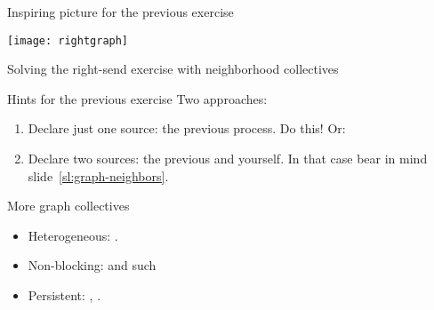 
\begin{exerciseframe}[rightgraph]
  \hyperlink{exserialsend}{}

  
\end{exerciseframe}

\begin{numberedframe}{Inspiring picture for the previous exercise}
  \label{fig:rightgraph}

  \texttt{[image: rightgraph]}

  Solving the right-send exercise with neighborhood
  collectives
\end{numberedframe}

\begin{numberedframe}{Hints for the previous exercise}
  Two approaches:
  \begin{enumerate}
  \item Declare just one source: the previous process. Do this! Or:
  \item Declare two sources: the previous and yourself.
    In that case bear in mind slide~\ref{sl:graph-neighbors}.
  \end{enumerate}
\end{numberedframe}

\begin{numberedframe}{More graph collectives}
  \begin{itemize}
  \item Heterogeneous: .
  \item Non-blocking:  and such
  \item Persistent:     ,
    .
  \end{itemize}
\end{numberedframe}

\endinput

\begin{numberedframe}{}
\end{numberedframe}

